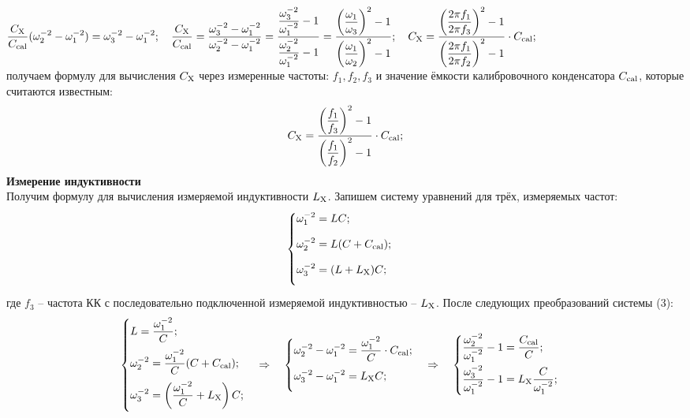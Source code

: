 \documentclass[12pt,a4paper]{article}
\newcommand{\ds}{\displaystyle}
\newcommand{\cc}{C_{\rm cal}}
\newcommand{\cx}{C_{\rm X}}
\newcommand{\lx}{L_{\rm X}}
\begin{document}
	$\ds \frac{\cx}{\cc}(\omega_2^{-2} - \omega_1^{-2}) = \omega_3^{-2} - \omega_1^{-2}; \quad
	\frac{\cx}{\cc} = \frac{\omega_3^{-2} - \omega_1^{-2}}{\omega_2^{-2} - \omega_1^{-2}} =
	\frac{\ds\frac{\omega_3^{-2}}{\omega_1^{-2}} - 1}{\ds\frac{\omega_2^{-2}}{\omega_1^{-2}} - 1} =
	\frac{{\left(\ds\frac{\omega_1}{\omega_3}\right)}^2 - 1}{{\left(\ds\frac{\omega_1}{\omega_2}\right)}^2 - 1}; \quad
	\cx = \frac{{\left(\ds\frac{2\pi f_1}{2\pi f_3}\right)}^2 - 1}{{\left(\ds\frac{2\pi f_1}{2\pi f_2}\right)}^2 - 1} \cdot \cc;$ \\[5pt]
	получаем формулу для вычисления $\cx$ через измеренные частоты: $f_1, f_2, f_3$ и значение ёмкости
	калибровочного конденсатора $\cc$, которые считаются известным:
	\begin{equation}
		\ds \cx = \frac{{\left(\ds\frac{f_1}{f_3}\right)}^2 - 1}{{\left(\ds\frac{f_1}{f_2}\right)}^2 - 1} \cdot \cc;
	\end{equation}
	\newpage
	\textbf{Измерение индуктивности} \\
	Получим формулу для вычисления измеряемой индуктивности $\lx$. 
	Запишем систему уравнений для трёх, измеряемых частот: \\
	\begin{equation}
		\begin{cases}
			\ds \omega_1^{-2} = LC; \\[9pt]
			\ds \omega_2^{-2} = L(C+\cc); \\[9pt]
			\ds \omega_3^{-2} = (L+\lx)C; \\[9pt]
		\end{cases}
	\end{equation}
	где $\ds f_3$ -- частота КК с последовательно подключенной 
	измеряемой индуктивностью -- $\ds\lx$.
	После следующих преобразований системы (3): \\
	\begin{equation*}
		\begin{cases}
			\ds L = \frac{\omega_1^{-2}}{C}; \\[9pt]
			\ds \omega_2^{-2} = \frac{\omega_1^{-2}}{C}(C+\cc); \\[9pt]
			\ds \omega_3^{-2} = \left(\frac{\omega_1^{-2}}{C}+\lx\right)C; \\[9pt]
		\end{cases} \Rightarrow \quad
		\begin{cases}
			\ds \omega_2^{-2} - \omega_1^{-2} = \frac{\omega_1^{-2}}{C}\cdot\cc; \\[9pt]
			\ds \omega_3^{-2} - \omega_1^{-2} = \lx C; \\[9pt]
		\end{cases} \Rightarrow \quad
		\begin{cases}
			\ds \frac{\omega_2^{-2}}{\omega_1^{-2}} - 1 = \frac{\cc}{C}; \\[9pt]
			\ds \frac{\omega_3^{-2}}{\omega_1^{-2}} - 1 = \lx\frac{C}{\omega_1^{-2}}; \\[9pt]
		\end{cases}
	\end{equation*}
\end{document}
